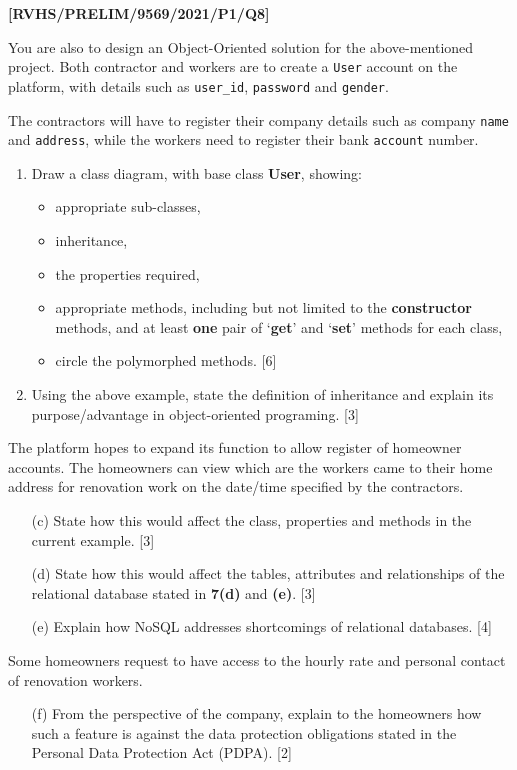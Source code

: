 \item \textbf{{[}RVHS/PRELIM/9569/2021/P1/Q8{]} }

You are also to design an Object-Oriented solution for the above-mentioned
project. Both contractor and workers are to create a \texttt{User}
account on the platform, with details such as \texttt{user\_id}, \texttt{password}
and \texttt{gender}. 

The contractors will have to register their company details such as
company \texttt{name} and \texttt{address}, while the workers need
to register their bank \texttt{account} number. 
\begin{enumerate}
\item Draw a class diagram, with base class \textbf{User}, showing: 
\begin{itemize}
\item appropriate sub-classes, 
\item inheritance, 
\item the properties required, 
\item appropriate methods, including but not limited to the \textbf{constructor}
methods, and at least \textbf{one} pair of \textquoteleft \textbf{get}\textquoteright{}
and \textquoteleft \textbf{set}\textquoteright{} methods for each
class, 
\item circle the polymorphed methods. \hfill{} {[}6{]}
\end{itemize}
\item Using the above example, state the definition of inheritance and explain
its purpose/advantage in object-oriented programing. \hfill{} {[}3{]}
\end{enumerate}
The platform hopes to expand its function to allow register of homeowner
accounts. The homeowners can view which are the workers came to their
home address for renovation work on the date/time specified by the
contractors. 
\begin{enumerate}
\item[(c)] State how this would affect the class, properties and methods in
the current example. \hfill{} {[}3{]}
\item[(d)] State how this would affect the tables, attributes and relationships
of the relational database stated in \textbf{7(d)} and \textbf{(e)}.
\hfill{} {[}3{]}
\item[(e)] Explain how NoSQL addresses shortcomings of relational databases.
\hfill{} {[}4{]}
\end{enumerate}
Some homeowners request to have access to the hourly rate and personal
contact of renovation workers. 
\begin{enumerate}
\item[(f)]  From the perspective of the company, explain to the homeowners how
such a feature is against the data protection obligations stated in
the Personal Data Protection Act (PDPA). \hfill{} {[}2{]}
\end{enumerate}